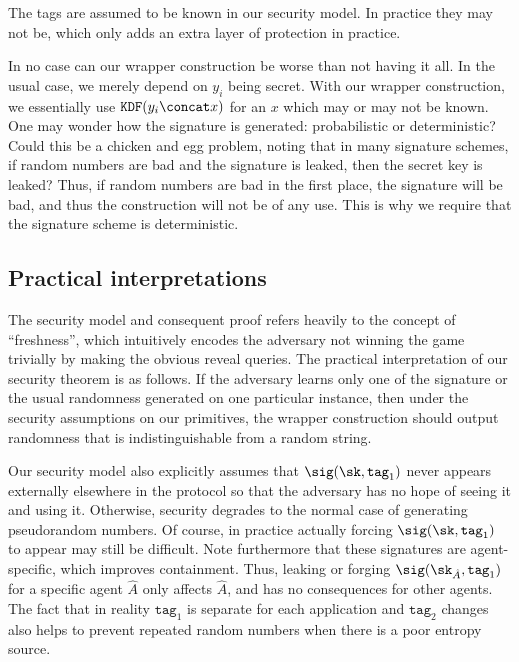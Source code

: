 \documentclass{article}
\begin{document}
{The tags are assumed to be known in our security model. In practice they may not be, which only adds an extra layer of protection in practice.

In no case can our wrapper construction be worse than not having it all. In the usual case, we merely depend on $y_i$ being secret. With our wrapper construction, we essentially use $\texttt{KDF}(y_i \concat x)$ for an $x$ which may or may not be known. One may wonder how the signature is generated: probabilistic or deterministic? Could this be a chicken and egg problem, noting that in many signature schemes, if random numbers are bad and the signature is leaked, then the secret key is leaked? Thus, if random numbers are bad in the first place, the signature will be bad, and thus the construction will not be of any use. This is why we require that the signature scheme is deterministic.

\subsection{Practical interpretations}
The security model and consequent proof refers heavily to the concept of ``freshness'', which intuitively encodes the adversary not winning the game trivially by making the obvious reveal queries. The practical interpretation of our security theorem is as follows. If the adversary learns only one of the signature or the usual randomness generated on one particular instance, then under the security assumptions on our primitives, the wrapper construction should output randomness that is indistinguishable from a random string.

Our security model also explicitly assumes that $\sig (\sk, \texttt{tag}_1)$ never appears externally elsewhere in
the protocol so that the adversary has no hope of seeing it and using it. Otherwise, security degrades to the normal case of generating pseudorandom numbers. Of course, in practice actually
forcing $\sig (\sk, \texttt{tag}_1)$ to appear may still be difficult.  Note furthermore that these
signatures are agent-specific, which improves containment. Thus, leaking
or forging $\sig (\sk_{\hat A}, \texttt{tag}_1)$ for a specific agent $\hat A$ only affects $\hat A$, and
has no consequences for other agents.  The fact that in reality $\texttt{tag}_1$ is separate for each application and $\texttt{tag}_2$ changes also helps to prevent repeated random numbers when there is a poor entropy source. 

\vspace{10pt}

}
\end{document}
